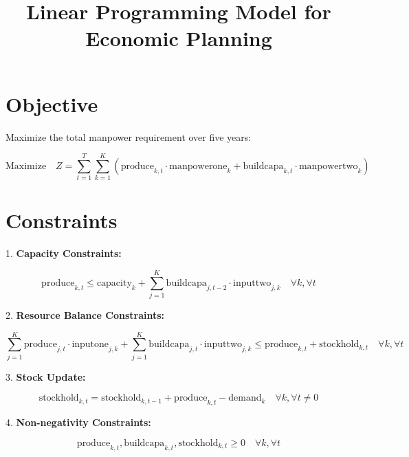 \documentclass{article}
\begin{document}
\title{Linear Programming Model for Economic Planning}
\author{}
\date{}
\maketitle

\section*{Objective}
Maximize the total manpower requirement over five years:

\[
\text{Maximize} \quad Z = \sum_{t=1}^{T} \sum_{k=1}^{K} (\text{produce}_{k,t} \cdot \text{manpowerone}_k + \text{buildcapa}_{k,t} \cdot \text{manpowertwo}_k)
\]

\section*{Constraints}

1. \textbf{Capacity Constraints:}

\[
\text{produce}_{k,t} \leq \text{capacity}_k + \sum_{j=1}^{K} \text{buildcapa}_{j,t-2} \cdot \text{inputtwo}_{j,k} \quad \forall k, \forall t
\]

2. \textbf{Resource Balance Constraints:}

\[
\sum_{j=1}^{K} \text{produce}_{j,t} \cdot \text{inputone}_{j,k} + \sum_{j=1}^{K} \text{buildcapa}_{j,t} \cdot \text{inputtwo}_{j,k} \leq \text{produce}_{k,t} + \text{stockhold}_{k,t} \quad \forall k, \forall t
\]

3. \textbf{Stock Update:}

\[
\text{stockhold}_{k,t} = \text{stockhold}_{k,t-1} + \text{produce}_{k,t} - \text{demand}_k \quad \forall k, \forall t \neq 0
\]

4. \textbf{Non-negativity Constraints:}

\[
\text{produce}_{k,t}, \text{buildcapa}_{k,t}, \text{stockhold}_{k,t} \geq 0 \quad \forall k, \forall t
\]
\end{document}
